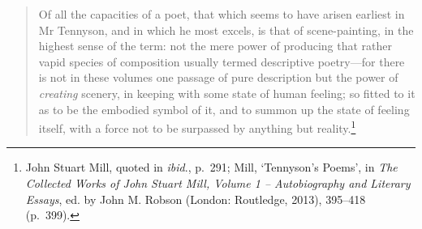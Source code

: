 \documentclass[]{article}
\begin{document}
\begin{quote}
Of all the capacities of a poet, that which seems to have arisen
earliest in Mr Tennyson, and in which he most excels, is that of
scene-painting, in the highest sense of the term: not the mere power of
producing that rather vapid species of composition usually termed
descriptive poetry---for there is not in these volumes one passage of
pure description but the power of \emph{creating} scenery, in keeping
with some state of human feeling; so fitted to it as to be the embodied
symbol of it, and to summon up the state of feeling itself, with a force
not to be surpassed by anything but reality.\footnote{John Stuart Mill,
  quoted in \emph{ibid}., p.~291; Mill, `Tennyson's Poems', in \emph{The
  Collected Works of John Stuart Mill, Volume 1 -- Autobiography and
  Literary Essays}, ed. by John M. Robson (London: Routledge, 2013),
  395--418 (p.~399).}
\end{quote}
\end{document}
